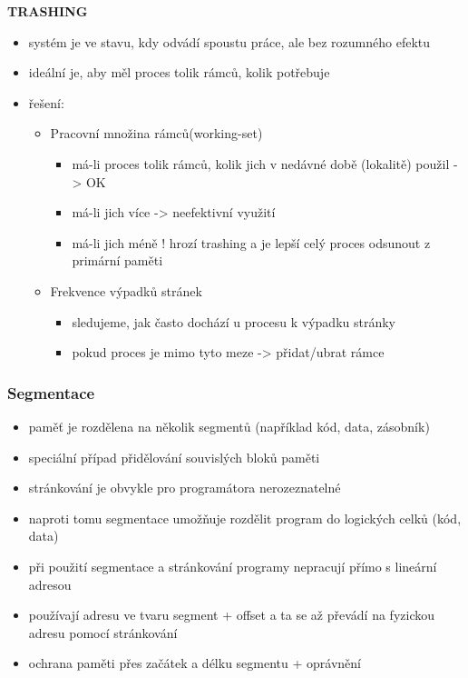\documentclass[10pt,a4paper]{article}
\begin{document}
\textbf{TRASHING}
\begin{itemize}
	\item systém je ve stavu, kdy odvádí spoustu práce, ale bez rozumného efektu
	\item ideální je, aby měl proces tolik rámců, kolik potřebuje
	\item řešení:
	\begin{itemize}
		\item Pracovní množina rámců(working-set)
		\begin{itemize}
			\item má-li proces tolik rámců, kolik jich v nedávné době (lokalitě) použil -> OK
			\item má-li jich více -> neefektivní využití
			\item má-li jich méně ! hrozí trashing a je lepší celý proces odsunout z primární paměti
		\end{itemize}
		\item Frekvence výpadků stránek
		\begin{itemize}
			\item sledujeme, jak často dochází u procesu k výpadku stránky
			\item pokud proces je mimo tyto meze -> přidat/ubrat rámce
		\end{itemize}
	\end{itemize}
\end{itemize}

\subsubsection{Segmentace}
\begin{itemize}
	\item paměť je rozdělena na několik segmentů (například kód, data, zásobník)
	\item speciální případ přidělování souvislých bloků paměti
	\item stránkování je obvykle pro programátora nerozeznatelné
	\item naproti tomu segmentace umožňuje rozdělit program do logických
celků (kód, data)
	\item při použití segmentace a stránkování programy nepracují přímo s
lineární adresou
	\item používají adresu ve tvaru segment + offset a ta se až převádí na
fyzickou adresu pomocí stránkování
	\item ochrana paměti přes začátek a délku segmentu + oprávnění
\end{itemize}
\end{document}
